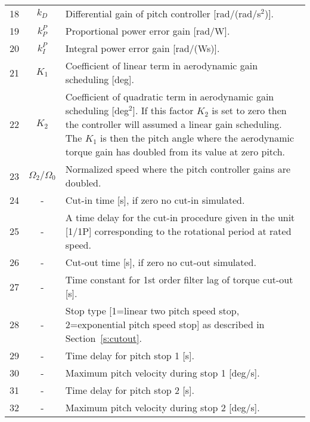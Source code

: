 \begin{table}[b]
\begin{center}
\begin{tabular}{r|c|p{11.5cm}}
18 & $k_D$ & Differential gain of pitch controller [rad/(rad/s$^2$)]. \\
19 & $k_P^P$ & Proportional power error gain [rad/W]. \\
20 & $k_I^P$ &Integral power error gain [rad/(Ws)]. \\
21 & $K_1$ & Coefficient of linear term in aerodynamic gain scheduling [deg]. \\
22 & $K_2$ & Coefficient of quadratic term in aerodynamic gain scheduling [deg$^2$]. If this factor $K_2$ is set to zero then the controller will assumed a linear gain scheduling. The $K_1$ is then the pitch angle where the aerodynamic torque gain has doubled from its value at zero pitch.\\
23 & $\Omega_2/\Omega_0$ & Normalized speed where the pitch controller gains are doubled.\\
24 & -& Cut-in time [s], if zero no cut-in simulated. \\
25 & -& A time delay for the cut-in procedure given in the unit [1/1P] corresponding to the rotational period at rated speed.\\
26 & -& Cut-out time [s], if zero no cut-out simulated. \\
27 & -& Time constant for 1st order filter lag of torque cut-out [s]. \\
28 & -& Stop type [1=linear two pitch speed stop, 2=exponential pitch speed stop] as described in Section~\ref{s:cutout}. \\
29 & -& Time delay for pitch stop 1 [s]. \\
30 & -& Maximum pitch velocity during stop 1 [deg/s]. \\
31 & -& Time delay for pitch stop 2 [s].\\
32 & -& Maximum pitch velocity during stop 2 [deg/s].
\end{tabular}
\end{center}
\end{table}
